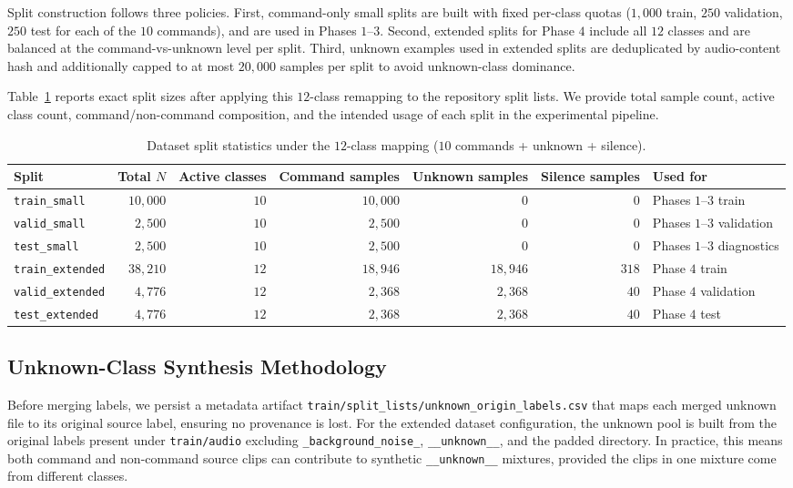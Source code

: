 \documentclass[cameraready]{Interspeech}
\begin{document}
Split construction follows three policies. First, command-only small splits are built with fixed per-class quotas ($1{,}000$ train, $250$ validation, $250$ test for each of the $10$ commands), and are used in Phases $1$--$3$. Second, extended splits for Phase $4$ include all $12$ classes and are balanced at the command-vs-unknown level per split. Third, unknown examples used in extended splits are deduplicated by audio-content hash and additionally capped to at most $20{,}000$ samples per split to avoid unknown-class dominance.

Table~\ref{tab:dataset_splits_12class} reports exact split sizes after applying this $12$-class remapping to the repository split lists. We provide total sample count, active class count, command/non-command composition, and the intended usage of each split in the experimental pipeline.

\begin{table}[h]
\centering
\caption{Dataset split statistics under the $12$-class mapping ($10$ commands + unknown + silence).}
\label{tab:dataset_splits_12class}
\scriptsize
\begin{tabular}{@{}lrrrrrl@{}}
\toprule
\textbf{Split} & \textbf{Total $N$} & \textbf{Active classes} & \textbf{Command samples} & \textbf{Unknown samples} & \textbf{Silence samples} & \textbf{Used for} \\ \midrule
\texttt{train\_small} & $10{,}000$ & $10$ & $10{,}000$ & $0$ & $0$ & Phases $1$--$3$ train \\
\texttt{valid\_small} & $2{,}500$ & $10$ & $2{,}500$ & $0$ & $0$ & Phases $1$--$3$ validation \\
\texttt{test\_small} & $2{,}500$ & $10$ & $2{,}500$ & $0$ & $0$ & Phases $1$--$3$ diagnostics \\
\texttt{train\_extended} & $38{,}210$ & $12$ & $18{,}946$ & $18{,}946$ & $318$ & Phase $4$ train \\
\texttt{valid\_extended} & $4{,}776$ & $12$ & $2{,}368$ & $2{,}368$ & $40$ & Phase $4$ validation \\
\texttt{test\_extended} & $4{,}776$ & $12$ & $2{,}368$ & $2{,}368$ & $40$ & Phase $4$ test \\ \bottomrule
\end{tabular}
\end{table}

\subsection{Unknown-Class Synthesis Methodology}
Before merging labels, we persist a metadata artifact \texttt{train/split\_lists/unknown\_origin\_labels.csv} that maps each merged unknown file to its original source label, ensuring no provenance is lost. For the extended dataset configuration, the unknown pool is built from the original labels present under \texttt{train/audio} excluding \texttt{\_background\_noise\_}, \texttt{\_\_unknown\_\_}, and the padded directory. In practice, this means both command and non-command source clips can contribute to synthetic \texttt{\_\_unknown\_\_} mixtures, provided the clips in one mixture come from different classes.
\end{document}
